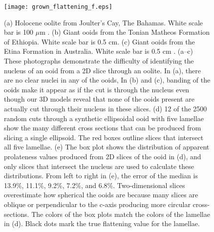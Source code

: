 \documentclass[draft]{agujournal2019}
\begin{document}
\begin{figure}
    \centering
    \texttt{[image: grown\_flattening\_f.eps]}
    \caption{(a) Holocene oolite from Joulter's Cay, The Bahamas. White scale bar is 100 $\mu$m \cite{maclennan2018arc}. (b) Giant ooids from the Tonian Matheos Formation of Ethiopia. White scale bar is 0.5 cm. (c) Giant ooids from the Etina Formation in Australia. White scale bar is 0.5 cm \cite{rose2013end}. (a--c) These photographs demonstrate the difficulty of identifying the nucleus of an ooid from a 2D slice through an oolite. In (a), there are no clear nuclei in any of the ooids, In (b) and (c), banding of the ooids make it appear as if the cut is through the nucleus even though our 3D models reveal that none of the ooids present are actually cut through their nucleus in these slices. (d) 12 of the 2500 random cuts through a synthetic ellipsoidal ooid with five lamellae show the many different cross sections that can be produced from slicing a single ellipsoid. The red boxes outline slices that intersect all five lamellae. (e) The box plot shows the distribution of apparent prolateness values produced from 2D slices of the ooid in (d), and only slices that intersect the nucleus are used to calculate these distributions. From left to right in (e), the error of the median is  13.9\%, 11.1\%, 9.2\%, 7.2\%, and 6.8\%. Two-dimensional slices overestimate how spherical the ooids are because many slices are oblique or perpendicular to the c-axis producing more circular cross-sections. The colors of the box plots match the colors of the lamellae in (d). Black dots mark the true flattening value for the lamellae.}
    \label{fig:grown_flattening}
\end{figure}
\end{document}
